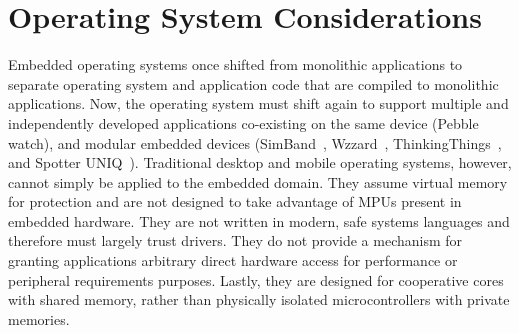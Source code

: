 \section{Operating System Considerations}
\label{os-considerations}

Embedded operating systems once shifted from monolithic applications to
separate operating system and application code that are compiled to monolithic
applications.
Now, the operating system must shift again to support multiple and
independently developed applications co-existing on the same device
(Pebble~\cite{pebble} watch), and modular embedded devices
(SimBand~\cite{simband}, Wzzard~\cite{wzzard}, ThinkingThings~\cite{thinkingthings}, and Spotter UNIQ~\cite{spotteruniq}).
Traditional desktop and mobile operating systems, however, cannot simply be
applied to the embedded domain. They assume virtual memory for protection and
are not designed to take advantage of MPUs present in embedded hardware. They
are not written in modern, safe systems languages and therefore must largely
trust drivers. They do not provide a mechanism for granting applications
arbitrary direct hardware access for performance or peripheral requirements
purposes.  Lastly, they are designed for cooperative cores with shared memory,
rather than physically isolated microcontrollers with private memories.




